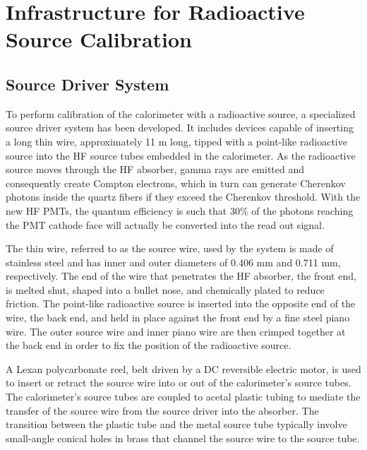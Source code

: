 \section{Infrastructure for Radioactive Source Calibration}\label{section:hf_exprimentalsetup}

\subsection{Source Driver System}
To perform calibration of the calorimeter with a radioactive source, a
specialized source driver system has been developed. It includes devices capable of inserting a long thin wire, approximately 11 m long, tipped with a point-like radioactive source into the HF source tubes embedded in the calorimeter. As the radioactive source moves through the HF absorber, gamma rays are emitted and consequently create Compton electrons, which in turn can generate Cherenkov photons inside the quartz fibers if they exceed the Cherenkov threshold. With the new HF PMTs, the quantum efficiency is such that 30\% of the photons reaching the PMT cathode face will actually be converted into the read out signal.

The thin wire, referred to as the source wire, used by the system is made of
stainless steel and has inner and outer diameters of 0.406 mm and 0.711 mm,
respectively. The end of the wire that penetrates the HF absorber, the front end,
is melted shut, shaped into a bullet nose, and chemically plated to reduce friction. The point-like radioactive source is inserted into the opposite end of
the wire, the back end, and held in place against the front end by a fine steel
piano wire. The outer source wire and inner piano wire are then crimped together at the back end in order to fix the position of the radioactive source.

A Lexan polycarbonate reel, belt driven by a DC reversible electric motor, is used
to insert or retract the source wire into or out of the calorimeter's source tubes.
The calorimeter's source tubes are coupled to acetal plastic tubing to mediate the
transfer of the source wire from the source driver into the absorber. The
transition between the plastic tube and the metal source tube typically involve
small-angle conical holes in brass that channel the source wire to the source tube.

